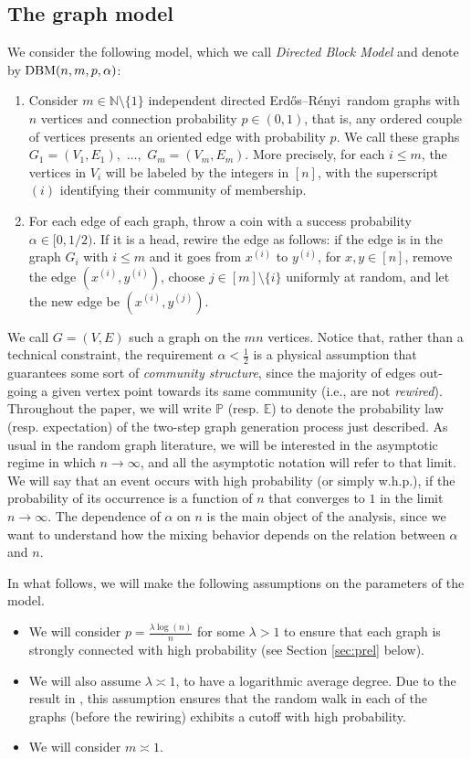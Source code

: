 \documentclass[11pt,oneside]{amsart}
\numberwithin{equation}{section}  %
\theoremstyle{plain}
\newcommand{\er}{Erdős–Rényi~}
\newcommand{\N}{\mathbb{N}}
\newcommand{\E}{\mathbb{E}}
\newcommand{\PP}{\mathbb{P}}
\begin{document}
\subsection{The graph model}\label{suse:graph-model}
We consider the following model, which we call \emph{Directed Block Model} and denote by ${\rm DBM}(n,m,p,\alpha)$:
\begin{enumerate}
\item[(1)] Consider $m\in\N\setminus\{1\}$ independent directed \er random graphs with $n$ vertices and connection probability $p\in(0,1)$, that is, any ordered couple of vertices presents an oriented edge with probability $p$. We call these graphs $G_1=(V_1,E_1),$ $\dots,$ $G_m=(V_m,E_m)$. More precisely, for each $i \le m$, the vertices in $V_i$ will be labeled by the integers in $[n]$, with the superscript $(i)$ identifying their community of membership.
\item[(2)] For each edge of each graph, throw a coin with a success probability $\alpha\in[0,1/2)$. If it is a head, rewire the edge as follows: if the edge is in the graph $G_i$ with $i \le m$ and it goes from $x^{(i)}$ to $y^{(i)}$, for $x,y\in[n]$, remove the edge $(x^{(i)},y^{(i)})$, choose 
$j\in[m]\setminus\{i\}$ uniformly at random, and let the new edge be $(x^{(i)},y^{(j)})$.
\end{enumerate}
We call $G=(V,E)$ such a graph on the $mn$ vertices.
Notice that, rather than a technical constraint, the requirement $\alpha< \frac12$ is a physical assumption that guarantees some sort of \emph{community structure}, since the majority of edges out-going a given vertex point towards its same community (i.e., are not \emph{rewired}).
 Throughout the paper, we will write $\PP$ (resp. $\E$) to denote the probability law (resp. expectation) of the two-step graph generation process just described.
 As usual in the random graph literature, we will be interested in the asymptotic regime in which $n\to\infty$, and all the asymptotic notation will refer to that limit. We will say that an event occurs with high probability (or simply w.h.p.), if the probability of its occurrence is a function of $n$ that converges to $1$ in the limit $n\to\infty$. 
 The dependence of $\alpha$ on $n$ is the main object of the analysis, since we want to understand how the mixing behavior depends on the relation between $\alpha$ and $n$.



In what follows, we will make the following assumptions on the parameters of the model.
\begin{itemize}
\item We will consider $p=\frac{\lambda\log(n)}{n}$ for some $\lambda>1$ to ensure that each graph is strongly connected with high probability (see Section \ref{sec:prel} below).
\item We will also assume $\lambda\asymp 1$, to have a logarithmic average degree. Due to the result in \cite{BP}, this assumption ensures that the random walk in each of the graphs (before the rewiring) exhibits a cutoff with high probability.
\item We will consider $m\asymp 1$.
\end{itemize}
\end{document}
